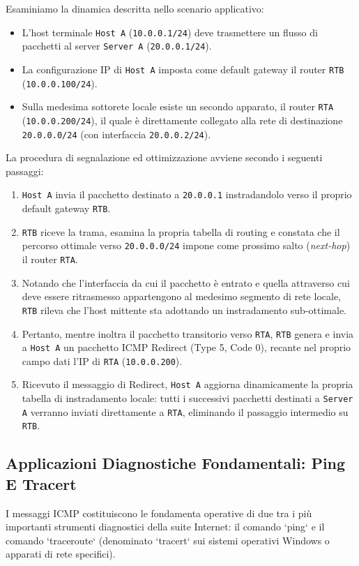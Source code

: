 \documentclass[11pt, a4paper]{article}
\begin{document}
Esaminiamo la dinamica descritta nello scenario applicativo:
\begin{itemize}
    \item L'host terminale \texttt{Host A} (\texttt{10.0.0.1/24}) deve trasmettere un flusso di pacchetti al server \texttt{Server A} (\texttt{20.0.0.1/24}).
    \item La configurazione IP di \texttt{Host A} imposta come default gateway il router \texttt{RTB} (\texttt{10.0.0.100/24}).
    \item Sulla medesima sottorete locale esiste un secondo apparato, il router \texttt{RTA} (\texttt{10.0.0.200/24}), il quale è direttamente collegato alla rete di destinazione \texttt{20.0.0.0/24} (con interfaccia \texttt{20.0.0.2/24}).
\end{itemize}
La procedura di segnalazione ed ottimizzazione avviene secondo i seguenti passaggi:
\begin{enumerate}
    \item \texttt{Host A} invia il pacchetto destinato a \texttt{20.0.0.1} instradandolo verso il proprio default gateway \texttt{RTB}.
    \item \texttt{RTB} riceve la trama, esamina la propria tabella di routing e constata che il percorso ottimale verso \texttt{20.0.0.0/24} impone come prossimo salto (\emph{next-hop}) il router \texttt{RTA}.
    \item Notando che l'interfaccia da cui il pacchetto è entrato e quella attraverso cui deve essere ritrasmesso appartengono al medesimo segmento di rete locale, \texttt{RTB} rileva che l'host mittente sta adottando un instradamento sub-ottimale.
    \item Pertanto, mentre inoltra il pacchetto transitorio verso \texttt{RTA}, \texttt{RTB} genera e invia a \texttt{Host A} un pacchetto ICMP Redirect (Type 5, Code 0), recante nel proprio campo dati l'IP di \texttt{RTA} (\texttt{10.0.0.200}).
    \item Ricevuto il messaggio di Redirect, \texttt{Host A} aggiorna dinamicamente la propria tabella di instradamento locale: tutti i successivi pacchetti destinati a \texttt{Server A} verranno inviati direttamente a \texttt{RTA}, eliminando il passaggio intermedio su \texttt{RTB}.
\end{enumerate}

\subsection{Applicazioni Diagnostiche Fondamentali: Ping E Tracert}
I messaggi ICMP costituiscono le fondamenta operative di due tra i più importanti strumenti diagnostici della suite Internet: il comando `ping` e il comando `traceroute` (denominato `tracert` sui sistemi operativi Windows o apparati di rete specifici).
\end{document}
